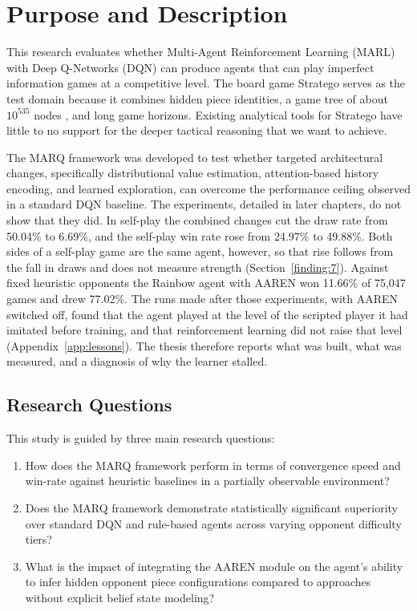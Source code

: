 \section{Purpose and Description}
This research evaluates whether Multi-Agent Reinforcement Learning (MARL) with Deep Q-Networks (DQN) can produce agents that can play imperfect information games at a competitive level. The board game Stratego serves as the test domain because it combines hidden piece identities, a game tree of about $10^{535}$ nodes \cite{perolat2022stratego}, and long game horizons. Existing analytical tools for Stratego have little to no support for the deeper tactical reasoning that we want to achieve. 

The MARQ framework was developed to test whether targeted architectural changes, specifically distributional value estimation, attention-based history encoding, and learned exploration, can overcome the performance ceiling observed in a standard DQN baseline. The experiments, detailed in later chapters, do not show that they did. In self-play the combined changes cut the draw rate from 50.04\% to 6.69\%, and the self-play win rate rose from 24.97\% to 49.88\%. Both sides of a self-play game are the same agent, however, so that rise follows from the fall in draws and does not measure strength (Section~\ref{finding:7}). Against fixed heuristic opponents the Rainbow agent with AAREN won 11.66\% of 75,047 games and drew 77.02\%. The runs made after those experiments, with AAREN switched off, found that the agent played at the level of the scripted player it had imitated before training, and that reinforcement learning did not raise that level (Appendix~\ref{app:lessons}). The thesis therefore reports what was built, what was measured, and a diagnosis of why the learner stalled.
\subsection{Research Questions}
This study is guided by three main research questions:

\begin{enumerate}
   
    \item How does the MARQ framework perform in terms of convergence speed and win-rate against heuristic baselines in a partially observable environment?
    \item Does the MARQ framework demonstrate statistically significant superiority over standard DQN and rule-based agents across varying opponent difficulty tiers?
    \item What is the impact of integrating the AAREN module on the agent's ability to infer hidden opponent piece configurations compared to approaches without explicit belief state modeling?
\end{enumerate}

